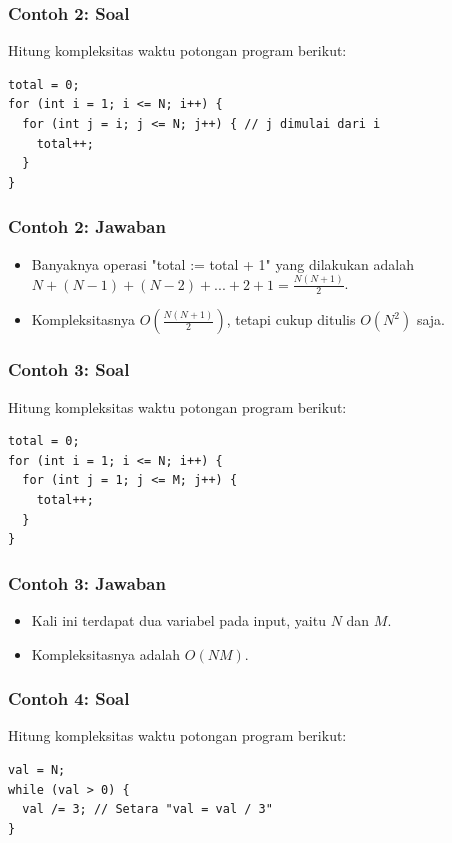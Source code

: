 \begin{frame}[fragile]
\frametitle{Contoh 2: Soal}
Hitung kompleksitas waktu potongan program berikut:

\hfill

\begin{lstlisting}
total = 0;
for (int i = 1; i <= N; i++) {
  for (int j = i; j <= N; j++) { // j dimulai dari i
    total++;
  }
}
\end{lstlisting}
\end{frame}

\begin{frame}
\frametitle{Contoh 2: Jawaban}
\begin{itemize}
  \item Banyaknya operasi "total := total + 1" yang dilakukan adalah $N + (N-1) + (N-2) + ... + 2 + 1 = \frac{N(N+1)}{2}$.
  \item Kompleksitasnya $O \left( \frac{N(N+1)}{2} \right)$, tetapi cukup ditulis $O(N^2)$ saja.
\end{itemize}
\end{frame}

\begin{frame}[fragile]
\frametitle{Contoh 3: Soal}
Hitung kompleksitas waktu potongan program berikut:

\hfill

\begin{lstlisting}
total = 0;
for (int i = 1; i <= N; i++) {
  for (int j = 1; j <= M; j++) {
    total++;
  }
}
\end{lstlisting}
\end{frame}

\begin{frame}
\frametitle{Contoh 3: Jawaban}
\begin{itemize}
  \item Kali ini terdapat dua variabel pada input, yaitu $N$ dan $M$.
  \item Kompleksitasnya adalah $O(NM)$.
\end{itemize}
\end{frame}

\begin{frame}[fragile]
\frametitle{Contoh 4: Soal}
Hitung kompleksitas waktu potongan program berikut:

\hfill

\begin{lstlisting}
val = N;
while (val > 0) {
  val /= 3; // Setara "val = val / 3"
}
\end{lstlisting}
\end{frame}

